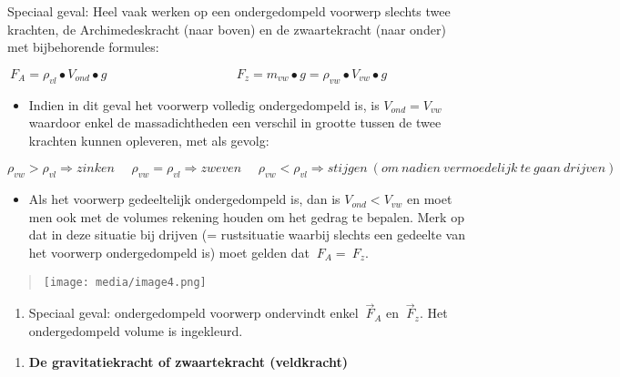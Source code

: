\documentclass{ximera}
\newcommand{\ul}[1]{#1}
\begin{document}
\ul{Speciaal geval:} Heel vaak werken op een ondergedompeld voorwerp
slechts twee krachten, de Archimedeskracht (naar boven) en de
zwaartekracht (naar onder) met bijbehorende formules:

\({\ F}_{A} = \rho_{vl} \bullet V_{ond} \bullet g\ \ \ \ \ \ \ \ \ \ \ \ \ \ \ \ \ \ \ \ \ \ \ \ \ \ \ \ \ \ \ \ \ \ \ \ \ \ \ \ \ \ \ \ \ {\ F}_{z} = m_{vw} \bullet g = \rho_{vw} \bullet V_{vw} \bullet g\)

\begin{itemize}
\item
  Indien in dit geval het voorwerp \ul{volledig ondergedompeld} is, is
  \(V_{ond} = V_{vw}\) waardoor enkel de massadichtheden een verschil in
  grootte tussen de twee krachten kunnen opleveren, met als gevolg:
\end{itemize}

\[\rho_{vw} > \rho_{vl}\overset{}{\Rightarrow}zinken\ \ \ \ \ \ \rho_{vw} = \rho_{vl}\overset{}{\Rightarrow}zweven\ \ \ \ \ \ \rho_{vw} < \rho_{vl}\overset{}{\Rightarrow}stijgen\ (om\ nadien\ vermoedelijk\ te\ gaan\ drijven)\]

\begin{itemize}
\item
  Als het voorwerp \ul{gedeeltelijk ondergedompeld} is, dan is
  \(V_{ond} < V_{vw}\) en moet men ook met de volumes rekening houden om
  het gedrag te bepalen. Merk op dat in deze situatie bij drijven (=
  rustsituatie waarbij slechts een gedeelte van het voorwerp
  ondergedompeld is) moet gelden dat \({\ F}_{A} = {\ F}_{z}\).
\end{itemize}

\begin{quote}
\texttt{[image: media/image4.png]}
\end{quote}

\begin{enumerate}
\def\labelenumi{\arabic{enumi}.}
\item
  Speciaal geval: ondergedompeld voorwerp ondervindt enkel
  \({\ \overrightarrow{F}}_{A}\) en \({\ \overrightarrow{F}}_{z}\). Het
  ondergedompeld volume is ingekleurd.
\end{enumerate}

\begin{enumerate}
\def\labelenumi{\arabic{enumi}.}
\setcounter{enumi}{3}
\item
  \textbf{De gravitatiekracht of zwaartekracht (veldkracht)}
\end{enumerate}
\end{document}
